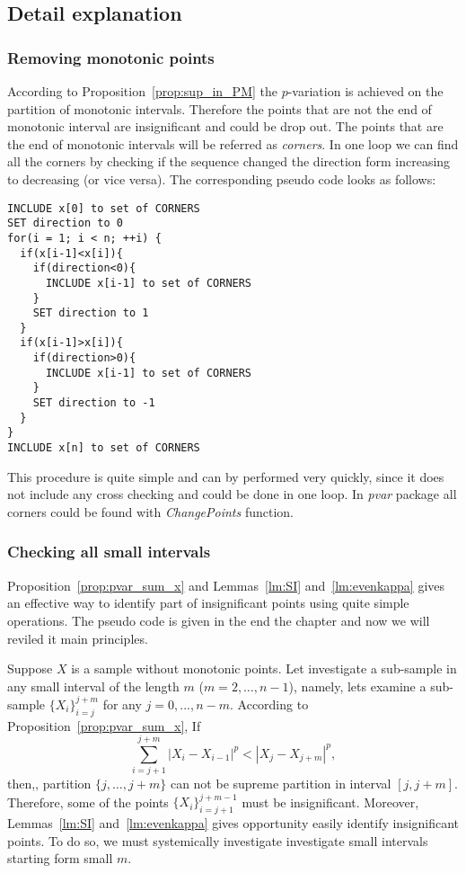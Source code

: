 \documentclass[12pt, a4paper]{article}
\numberwithin{equation}{section}
\begin{document}
\subsection{Detail explanation}

\subsubsection{Removing monotonic points}

According to Proposition~\ref{prop:sup_in_PM}
the $p$-variation is achieved 
on the partition of monotonic intervals.
Therefore the points that are not 
the end of monotonic interval are insignificant 
and could be drop out.
The points that are the end of monotonic intervals
will be referred as \emph{corners}. 
In one loop we can 
find all the corners by checking if the sequence
changed the direction form increasing to decreasing
(or vice versa).
The corresponding pseudo code looks as follows:

\begin{lstlisting}
INCLUDE x[0] to set of CORNERS 
SET direction to 0 
for(i = 1; i < n; ++i) {
  if(x[i-1]<x[i]){
    if(direction<0){
      INCLUDE x[i-1] to set of CORNERS 
    }     
    SET direction to 1 
  }
  if(x[i-1]>x[i]){
    if(direction>0){
      INCLUDE x[i-1] to set of CORNERS 
    }     
    SET direction to -1 
  }        
}  
INCLUDE x[n] to set of CORNERS 
\end{lstlisting}

This procedure is quite simple and
 can by performed very quickly, since it does not include
any cross checking and could be done in one loop.
In \emph{pvar} package all corners could be found with \emph{ChangePoints} function.



\subsubsection{Checking all small intervals}
\label{sec:CheckSmallIntervals}

Proposition~\ref{prop:pvar_sum_x} and 
Lemmas~\ref{lm:SI} and~\ref{lm:evenkappa} gives an effective 
way to identify part of insignificant points 
using quite simple operations. 
The pseudo code is given in the end the chapter and
now we will reviled it main principles.

Suppose $X$ is a sample without monotonic points. 
Let investigate a sub-sample in
any small interval of the length $m$ ($m=2,\dots,n-1$), 
namely, lets examine a sub-sample 
$\{X_{i}\}_{i=j}^{j+m}$
for any $j=0,...,n-m$.
According to Proposition~\ref{prop:pvar_sum_x},
If 
\begin{equation}\label{eq:dropsamll1}
  \sum_{i=j+1}^{j+m} |X_{i}-X_{i-1}|^p < |X_j-X_{j+m}|^p,
\end{equation}
then,,
partition $\{j,\dots,j+m\}$ 
can not be supreme partition in interval
$[j,j+m]$. 
Therefore, some of the points $\{X_{i}\}_{i=j+1}^{j+m-1}$
must be insignificant.
Moreover, Lemmas~\ref{lm:SI} and~\ref{lm:evenkappa} 
gives opportunity easily identify 
insignificant points. To do so, we must 
systemically investigate investigate small intervals starting form
small $m$.
\end{document}

